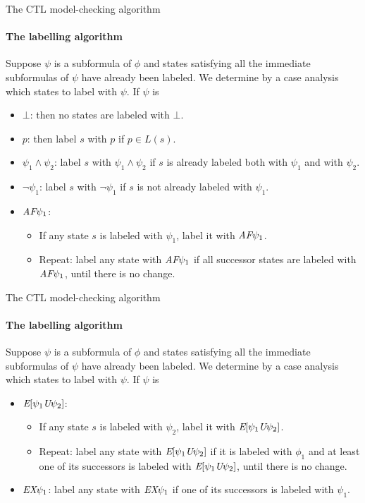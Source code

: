 \begin{frame}{The CTL model-checking algorithm}
	\framesubtitle{The labelling algorithm}
	Suppose $\psi$ is a subformula of $\phi$ and states satisfying all the immediate subformulas of $\psi$ have already been labeled. We determine by a case analysis which states to label with $\psi$. If $\psi$ is
	
	\begin{itemize}
		\item
		{
			$\bot$: then no states are labeled with $\bot$.
			\pause
		}
		\item
		{
			$p$: then label $s$ with $p$ if $p \in L(s)$.
			\pause
		}
		\item
		{
			$\psi_{1} \land \psi_{2}$: label $s$ with $\psi_{1} \land \psi_{2}$ if $s$ is already labeled both with $\psi_{1}$ and with $\psi_{2}$.
			\pause
		}
		\item
		{
			$\neg \psi_{1}$: label $s$ with $\neg \psi_{1}$ if $s$ is not already labeled with $\psi_{1}$.
			\pause
		}
		\item
		{
			$\textit{A}\textit{F} \psi_{1}$:
			\begin{itemize}
				\item If any state $s$ is labeled with $\psi_{1}$, label it with $\textit{A}\textit{F} \psi_{1}$.
				\item Repeat: label any state with $\textit{A}\textit{F} \psi_{1}$ if all successor states are labeled with $\textit{A}\textit{F} \psi_{1}$, until there is no change.
			\end{itemize} 
		}
	\end{itemize} 
\end{frame}

\begin{frame}{The CTL model-checking algorithm}
	\framesubtitle{The labelling algorithm}
	Suppose $\psi$ is a subformula of $\phi$ and states satisfying all the immediate subformulas of $\psi$ have already been labeled. We determine by a case analysis which states to label with $\psi$. If $\psi$ is
	
	\begin{itemize}
		\item
		{
			$\textit{E}[\psi_{1} \textit{U} \psi_{2}]$:
			\begin{itemize}
				\item If any state $s$ is labeled with $\psi_{2}$, label it with $\textit{E}[\psi_{1} \textit{U} \psi_{2}]$.
				\item Repeat: label any state with $\textit{E}[\psi_{1} \textit{U} \psi_{2}]$ if it is labeled with $\phi_{1}$ and at least
				one of its successors is labeled with $\textit{E}[\psi_{1} \textit{U} \psi_{2}]$, until there is no change.
			\end{itemize}
			\pause
		}
		\item
		{
			$\textit{E}\textit{X} \psi_{1}$: label any state with $\textit{E}\textit{X} \psi_{1}$ if one of its successors is labeled with $\psi_{1}$.
		}
	\end{itemize}
\end{frame}

